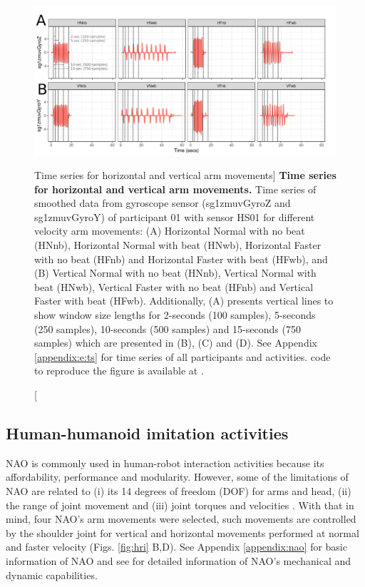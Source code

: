 \begin{figure}
  \centering
  \includegraphics[width=1.0\textwidth]{fig_4_02}
    \caption
	[Time series for horizontal and vertical arm movements]{
	{\bf Time series for horizontal and vertical arm movements.} 
		Time series of smoothed data from gyroscope sensor 
		(sg1zmuvGyroZ and sg1zmuvGyroY) of participant 01 
		with sensor HS01 for different velocity arm movements: 
		(A) Horizontal Normal with no beat (HNnb),
			Horizontal Normal with beat (HNwb), 
			Horizontal Faster with no beat (HFnb) and
			Horizontal Faster with beat (HFwb), and 
		(B) Vertical Normal with no beat (HNnb),
			Vertical Normal with beat (HNwb), 
			Vertical Faster with no beat (HFnb) and
			Vertical Faster with beat (HFwb).
		Additionally, (A) presents vertical lines 
		to show window size lengths for 2-seconds 
		(100 samples), 5-seconds (250 samples), 
		10-seconds (500 samples) and 15-seconds (750 samples)
		which are presented in (B), (C) and (D).
	See Appendix \ref{appendix:e:ts} for 
	time series of all participants and activities. 
	\R code to reproduce the figure is available at 
	.
        }
	\label{fig:hii-sts}
\end{figure}

\subsection{Human-humanoid imitation activities} \label{sec:experiment:hhi}
NAO is commonly used in human-robot interaction activities because 
its affordability, performance and modularity.
However, some of the limitations of NAO are related to 
(i) its 14 degrees of freedom (DOF) for arms and head,
(ii) the range of joint movement and 
(iii) joint torques and velocities \citep{gouaillier2009}. 
With that in mind, four NAO's arm movements were selected,
such movements are controlled by the shoulder joint 
for vertical and horizontal movements performed at 
normal and faster velocity (Figs. \ref{fig:hri} B,D).
See Appendix \ref{appendix:nao} for basic information 
of NAO and see \cite{gouaillier2009} 
for detailed information of NAO's mechanical 
and dynamic capabilities.

